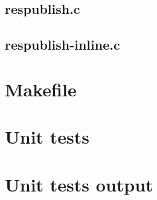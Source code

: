 \subsection{respublish.c}

\begin{scriptsize}
\begin{ttfamily}

\end{ttfamily}
\end{scriptsize}

\subsection{respublish-inline.c}

\begin{scriptsize}
\begin{ttfamily}

\end{ttfamily}
\end{scriptsize}

\section{Makefile}

\begin{scriptsize}
\begin{ttfamily}

\end{ttfamily}
\end{scriptsize}

\section{Unit tests}

\begin{scriptsize}
\begin{ttfamily}

\end{ttfamily}
\end{scriptsize}

\section{Unit tests output}

\begin{scriptsize}
\begin{ttfamily}

\end{ttfamily}
\end{scriptsize}
